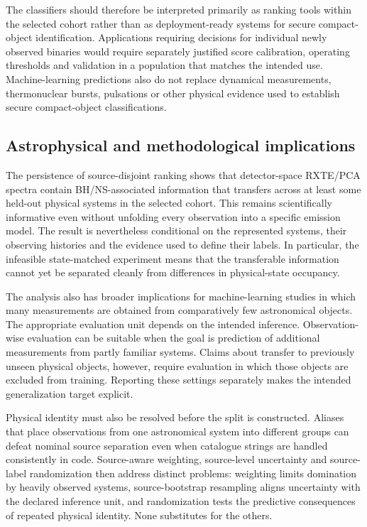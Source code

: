\documentclass[final,5p,authoryear,nopreprintline]{elsarticle}
\begin{document}
The classifiers should therefore be interpreted primarily as ranking tools within the selected cohort rather than as deployment-ready systems for secure compact-object identification. Applications requiring decisions for individual newly observed binaries would require separately justified score calibration, operating thresholds and validation in a population that matches the intended use. Machine-learning predictions also do not replace dynamical measurements, thermonuclear bursts, pulsations or other physical evidence used to establish secure compact-object classifications.

\subsection{Astrophysical and methodological implications}

The persistence of source-disjoint ranking shows that detector-space RXTE/PCA spectra contain BH/NS-associated information that transfers across at least some held-out physical systems in the selected cohort. This remains scientifically informative even without unfolding every observation into a specific emission model. The result is nevertheless conditional on the represented systems, their observing histories and the evidence used to define their labels. In particular, the infeasible state-matched experiment means that the transferable information cannot yet be separated cleanly from differences in physical-state occupancy.

The analysis also has broader implications for machine-learning studies in which many measurements are obtained from comparatively few astronomical objects. The appropriate evaluation unit depends on the intended inference. Observation-wise evaluation can be suitable when the goal is prediction of additional measurements from partly familiar systems. Claims about transfer to previously unseen physical objects, however, require evaluation in which those objects are excluded from training. Reporting these settings separately makes the intended generalization target explicit.

Physical identity must also be resolved before the split is constructed. Aliases that place observations from one astronomical system into different groups can defeat nominal source separation even when catalogue strings are handled consistently in code. Source-aware weighting, source-level uncertainty and source-label randomization then address distinct problems: weighting limits domination by heavily observed systems, source-bootstrap resampling aligns uncertainty with the declared inference unit, and randomization tests the predictive consequences of repeated physical identity. None substitutes for the others.
\end{document}
